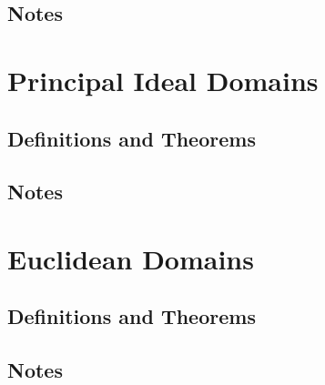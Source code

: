 \subsection*{Notes}

\newpage
\section{Principal Ideal Domains}
\subsection*{Definitions and Theorems}
\subsection*{Notes}

\newpage
\section{Euclidean Domains}
\subsection*{Definitions and Theorems}
\subsection*{Notes}